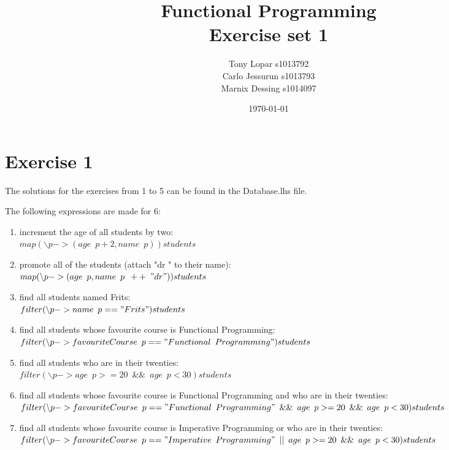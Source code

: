 \documentclass{article}
\begin{document}
\title{Functional Programming \\ Exercise set 1}
\date{\today}
\author{Tony Lopar s1013792 \\ Carlo Jessurun s1013793 \\ Marnix Dessing s1014097}
\maketitle

\section*{Exercise 1}
The solutions for the exercises from 1 to 5 can be found in the Database.lhs file.

The following expressions are made for 6:
\begin{enumerate}[label=\alph*)]
  \item increment the age of all students by two: \\
  $map (\backslash p -> (age \enspace p+2, name \enspace p)) students$
  \item promote all of the students (attach "dr " to their name): \\
  $map (\backslash p -> (age \enspace p, name \enspace p \enspace ++ \enspace "dr")) students$
  \item find all students named Frits: \\
  $filter(\backslash p -> name \enspace p == "Frits") students$
  \item find all students whose favourite course is Functional Programming: \\
  $filter(\backslash p -> favouriteCourse \enspace p == "Functional \enspace Programming") students$
  \item find all students who are in their twenties: \\
  $filter(\backslash p -> age \enspace p >= 20 \enspace \&\& \enspace age \enspace p < 30 ) students$
  \item find all students whose favourite course is Functional Programming and who are in their twenties: \\ $filter(\backslash p -> favouriteCourse \enspace p == "Functional \enspace Programming" \enspace \&\& \enspace age \enspace p >= 20 \enspace \&\& \enspace age \enspace p < 30) students$
  \item find all students whose favourite course is Imperative Programming or who are in their twenties: \\ $filter(\backslash p -> favouriteCourse \enspace p == "Imperative \enspace Programming" \enspace || \enspace age \enspace p >= 20 \enspace \&\& \enspace age \enspace p < 30) students$
\end{enumerate}
\end{document}

